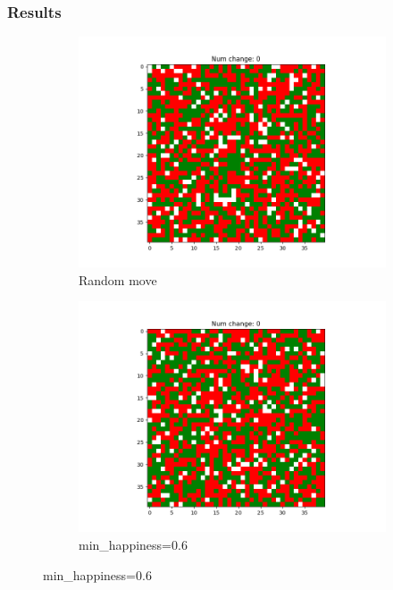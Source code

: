 \documentclass[11pt]{article}
\begin{document}
	\subsubsection{Results}
	\begin{figure}[h]
		\centering
		\begin{subfigure}{0.14\textwidth}
			\includegraphics[width=\linewidth]{initial_random.png}
			\caption{\centering Random move}
			\label{distance_finalrandom}
		\end{subfigure}\hfill
		\begin{subfigure}{0.14\textwidth}
			\includegraphics[width=\linewidth]{policy4_initial_min6.png}
			\caption{\centering min_happiness=0.6}
			\label{distance_finalmin6}
		\end{subfigure}\hfill

\end{figure}
\end{document}
